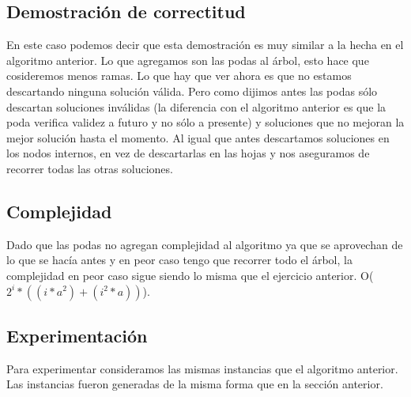 \subsection{Demostración de correctitud}
	
	En este caso podemos decir que esta demostración es muy similar a la hecha en el algoritmo anterior. Lo que agregamos son las podas al árbol, esto hace que cosideremos menos ramas. Lo que hay que ver ahora es que no estamos descartando ninguna solución válida. Pero como dijimos antes las podas sólo descartan soluciones inválidas (la diferencia con el algoritmo anterior es que la poda verifica validez a futuro y no sólo a presente) y soluciones que no mejoran la mejor solución hasta el momento. Al igual que antes descartamos soluciones en los nodos internos, en vez de descartarlas en las hojas y nos aseguramos de recorrer todas las otras soluciones.

\subsection{Complejidad}

	Dado que las podas no agregan complejidad al algoritmo ya que se aprovechan de lo que se hacía antes y en peor caso tengo que recorrer todo el árbol, la complejidad en peor caso sigue siendo lo misma que el ejercicio anterior. O($2^{i}*((i*a^{2})+(i^{2}*a))$). 
	
\subsection{Experimentación}

	Para experimentar consideramos las mismas instancias que el algoritmo anterior. Las instancias fueron generadas de la misma forma que en la sección anterior.	

